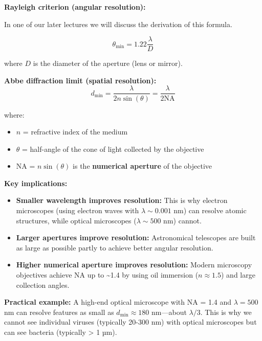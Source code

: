 \documentclass[
  a4paper,
]{book}
\providecommand{\tightlist}{%
  \setlength{\itemsep}{0pt}\setlength{\parskip}{0pt}}
\begin{document}
\begin{tcolorbox}[enhanced jigsaw, breakable, toptitle=1mm, bottomrule=.15mm, colbacktitle=quarto-callout-important-color!10!white, title=\textcolor{quarto-callout-important-color}{\faExclamation}\hspace{0.5em}{Optical Resolution Limits}, arc=.35mm, rightrule=.15mm, bottomtitle=1mm, opacityback=0, toprule=.15mm, coltitle=black, leftrule=.75mm, opacitybacktitle=0.6, colback=white, left=2mm, titlerule=0mm, colframe=quarto-callout-important-color-frame]

\textbf{Rayleigh criterion (angular resolution):}

In one of our later lectures we will discuss the derivation of this
formula.

\[\theta_{\text{min}} = 1.22\frac{\lambda}{D}\]

where \(D\) is the diameter of the aperture (lens or mirror).

\textbf{Abbe diffraction limit (spatial resolution):}
\[d_{\text{min}} = \frac{\lambda}{2n\sin(\theta)} = \frac{\lambda}{2\text{NA}}\]

where:

\begin{itemize}
\tightlist
\item
  \(n\) = refractive index of the medium
\item
  \(\theta\) = half-angle of the cone of light collected by the
  objective
\item
  NA = \(n\sin(\theta)\) is the \textbf{numerical aperture} of the
  objective
\end{itemize}

\textbf{Key implications:}

\begin{itemize}
\tightlist
\item
  \textbf{Smaller wavelength improves resolution:} This is why electron
  microscopes (using electron waves with \(\lambda \sim 0.001\) nm) can
  resolve atomic structures, while optical microscopes
  (\(\lambda \sim 500\) nm) cannot.
\item
  \textbf{Larger apertures improve resolution:} Astronomical telescopes
  are built as large as possible partly to achieve better angular
  resolution.
\item
  \textbf{Higher numerical aperture improves resolution:} Modern
  microscopy objectives achieve NA up to \textasciitilde1.4 by using oil
  immersion (\(n \approx 1.5\)) and large collection angles.
\end{itemize}

\textbf{Practical example:} A high-end optical microscope with NA = 1.4
and \(\lambda = 500\) nm can resolve features as small as
\(d_{\text{min}} \approx 180\) nm---about \(\lambda/3\). This is why we
cannot see individual viruses (typically 20-300 nm) with optical
microscopes but can see bacteria (typically \textgreater{} 1 µm).

\end{tcolorbox}
\end{document}
